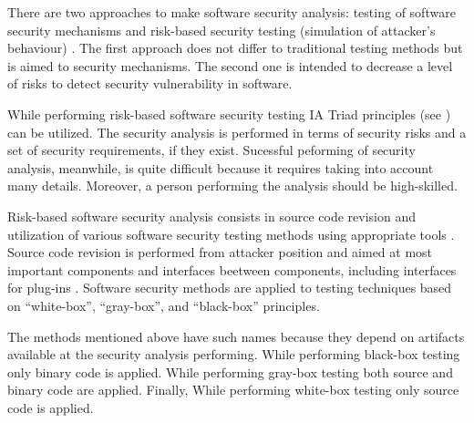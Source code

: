 %
There are two approaches to make software security analysis: testing of software security mechanisms and risk-based security testing (simulation of attacker's behaviour) . 
%
The first approach does not differ to traditional testing methods but is aimed to security mechanisms. 
%
The second one is intended to decrease a level of risks to detect security vulnerability in software. 

%
While performing risk-based software security testing IA Triad principles (see ) can be utilized. 
%
The security analysis is performed in terms of security risks and a set of security requirements, if they exist. 
%
Sucessful peforming of security analysis, meanwhile, is quite difficult because it requires taking into account many details. 
%
Moreover, a person performing the analysis should be high-skilled. 

%
Risk-based software security analysis consists in source code revision and utilization of various software security testing methods using appropriate tools . 
%
Source code revision is performed from \An attacker position and aimed at most important components and interfaces beetween components, including interfaces for plug-ins . 
%
Software security methods are applied to testing techniques based on ``white-box'', ``gray-box'', and ``black-box'' principles. 

%
The methods mentioned above have such names because they depend on artifacts available at the security analysis performing. 
%
While performing black-box testing only binary code is applied. 
%
While performing gray-box testing both source and binary code are applied. 
%
Finally, While performing white-box testing only source code is applied. 